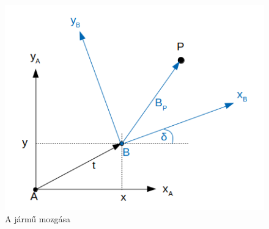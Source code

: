 \begin{figure}[h!]
\centering
\includegraphics[scale=0.70]{images/A_to_B_point.png}
\caption{A jármű mozgása}
\label{fig:a_to_b_point}
\end{figure}

\newpage

